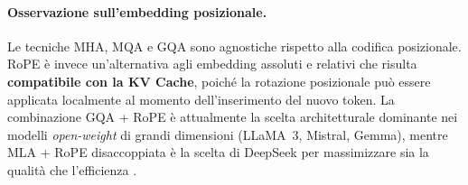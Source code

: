 \paragraph{Osservazione sull'embedding posizionale.}
Le tecniche MHA, MQA e GQA sono agnostiche rispetto alla codifica
posizionale. RoPE è invece un'alternativa agli embedding assoluti e
relativi che risulta \textbf{compatibile con la KV Cache}, poiché la
rotazione posizionale può essere applicata localmente al momento
dell'inserimento del nuovo token. La combinazione GQA + RoPE è attualmente
la scelta architetturale dominante nei modelli \emph{open-weight} di grandi
dimensioni (LLaMA~3, Mistral, Gemma), mentre MLA + RoPE disaccoppiata è
la scelta di DeepSeek per massimizzare sia la qualità che l'efficienza
\citep{deepseekv2_2024,ainslie2023gqa,su2024rope}.
